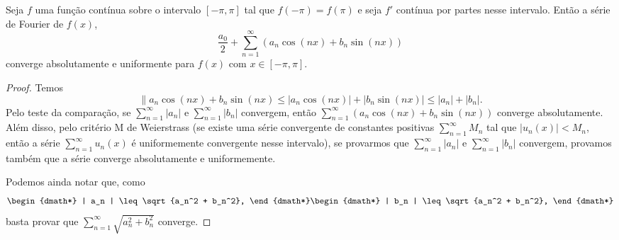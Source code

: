 \begin{teo}
  Seja $f$ uma função contínua sobre o intervalo $[-\pi, \pi]$ tal que $f(-\pi)
  = f(\pi)$ e seja $f'$ contínua por partes nesse intervalo. Então a série de
  Fourier de $f(x)$,
  \begin{dmath*}
    \frac{a_0}{2} + \sum_{n = 1}^\infty \left( a_n \cos\left( n x \right) + b_n
    \sin\left( n x \right) \right)
  \end{dmath*}
  converge absolutamente e uniformente para $f(x)$ com $x \in [-\pi,\pi]$.
\end{teo}
\begin{proof}
  Temos
  \begin{dmath*}
    \| a_n \cos\left( n x \right) + b_n \sin\left( n x \right) \leq | a_n
    \cos\left( n x \right) | + | b_n \sin\left( n x \right) |
    \leq | a_n | + | b_n |.
  \end{dmath*}
  Pelo teste da comparação, se $\sum_{n = 1}^\infty | a_n |$ e $\sum_{n =
  1}^\infty | b_n |$ convergem, então $\sum_{n = 1}^\infty \left( a_n \cos\left(
  n x \right) + b_n \sin\left( n x \right) \right)$ converge absolutamente. Além
  disso, pelo critério M de Weierstrass (se existe uma série convergente de
  constantes positivas $\sum_{n = 1}^\infty M_n$ tal que $| u_n(x) | < M_n$,
  então a série $\sum_{n = 1}^\infty u_n(x)$ é uniformemente convergente nesse
  intervalo), se provarmos que $\sum_{n = 1}^\infty | a_n |$ e $\sum_{n =
  1}^\infty | b_n |$ convergem, provamos também que a série converge
  absolutamente e uniformemente.

  Podemos ainda notar que, como
  \begin{dgroup*}
    \begin{dmath*}
      | a_n | \leq \sqrt{a_n^2 + b_n^2},
    \end{dmath*}
    \begin{dmath*}
      | b_n | \leq \sqrt{a_n^2 + b_n^2},
    \end{dmath*}
  \end{dgroup*}
  basta provar que $\sum_{n = 1}^\infty \sqrt{a_n^2 + b_n^2}$ converge.


\end{proof}
